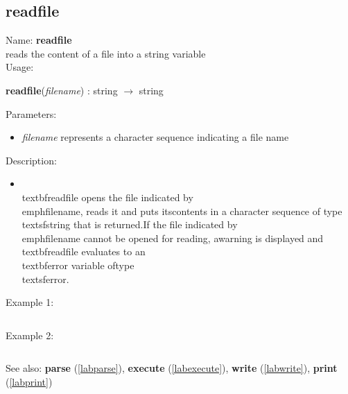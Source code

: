 \subsection{readfile}
\label{labreadfile}
\noindent Name: \textbf{readfile}\\
reads the content of a file into a string variable\\
\noindent Usage: 
\begin{center}
\textbf{readfile}(\emph{filename}) : \textsf{string} $\rightarrow$ \textsf{string}\\
\end{center}
Parameters: 
\begin{itemize}
\item \emph{filename} represents a character sequence indicating a file name
\end{itemize}
\noindent Description: \begin{itemize}

\item \\textbf{readfile} opens the file indicated by \\emph{filename}, reads it and puts its\n   contents in a character sequence of type \\textsf{string} that is returned.\n    \n   If the file indicated by \\emph{filename} cannot be opened for reading, a\n   warning is displayed and \\textbf{readfile} evaluates to an \\textbf{error} variable of\n   type \\textsf{error}.\n\end{itemize}
\noindent Example 1: 
\begin{center}\begin{minipage}{15cm}\begin{Verbatim}[frame=single]
\end{Verbatim}
\end{minipage}\end{center}
\noindent Example 2: 
\begin{center}\begin{minipage}{15cm}\begin{Verbatim}[frame=single]
\end{Verbatim}
\end{minipage}\end{center}
See also: \textbf{parse} (\ref{labparse}), \textbf{execute} (\ref{labexecute}), \textbf{write} (\ref{labwrite}), \textbf{print} (\ref{labprint})
